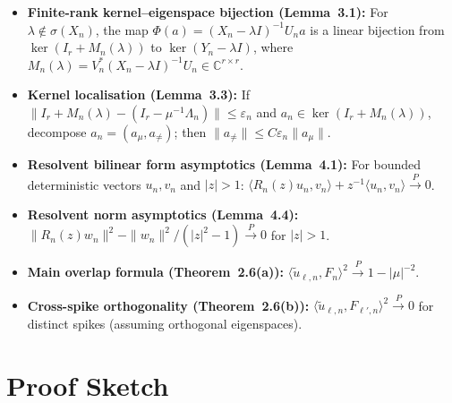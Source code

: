 \documentclass[11pt,a4paper]{article}
\begin{document}
\begin{itemize}
\item \textbf{Finite-rank kernel--eigenspace bijection (Lemma~3.1):} For $\lambda \notin \sigma(X_n)$, the map $\Phi(a) = (X_n - \lambda I)^{-1} U_n a$ is a linear bijection from $\ker(I_r + M_n(\lambda))$ to $\ker(Y_n - \lambda I)$, where $M_n(\lambda) = V_n^* (X_n - \lambda I)^{-1} U_n \in \mathbb{C}^{r\times r}$.

\item \textbf{Kernel localisation (Lemma~3.3):} If $\|I_r + M_n(\lambda) - (I_r - \mu^{-1}\Lambda_n)\| \le \varepsilon_n$ and $a_n \in \ker(I_r + M_n(\lambda))$, decompose $a_n = (a_\mu, a_{\neq})$; then $\|a_{\neq}\| \le C\varepsilon_n \|a_\mu\|$.

\item \textbf{Resolvent bilinear form asymptotics (Lemma~4.1):} For bounded deterministic vectors $u_n, v_n$ and $|z|>1$: $\langle R_n(z) u_n, v_n \rangle + z^{-1}\langle u_n, v_n\rangle \xrightarrow{P} 0$.

\item \textbf{Resolvent norm asymptotics (Lemma~4.4):} $\|R_n(z) w_n\|^2 - \|w_n\|^2/(|z|^2-1) \xrightarrow{P} 0$ for $|z|>1$.

\item \textbf{Main overlap formula (Theorem~2.6(a)):} $\langle \tilde{u}_{\ell,n}, F_n \rangle^2 \xrightarrow{P} 1 - |\mu|^{-2}$.

\item \textbf{Cross-spike orthogonality (Theorem~2.6(b)):} $\langle \tilde{u}_{\ell,n}, F_{\ell',n} \rangle^2 \xrightarrow{P} 0$ for distinct spikes (assuming orthogonal eigenspaces).
\end{itemize}

\section{Proof Sketch}
\end{document}
